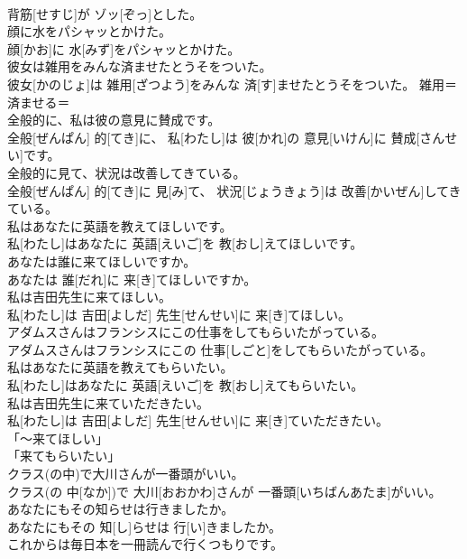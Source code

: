 \documentclass[8pt]{extreport}
\begin{document}
\begin{CJK}{UTF8}{min}
\\	背筋[せすじ]が ゾッ[ぞっ]とした。	
\\	顔に水をパシャッとかけた。	
\\	顔[かお]に 水[みず]をパシャッとかけた。	
\\	彼女は雑用をみんな済ませたとうそをついた。	
\\	彼女[かのじょ]は 雑用[ざつよう]をみんな 済[す]ませたとうそをついた。	雑用＝ 
\\	済ませる＝ 
\\	全般的に、私は彼の意見に賛成です。	
\\	全般[ぜんぱん] 的[てき]に、 私[わたし]は 彼[かれ]の 意見[いけん]に 賛成[さんせい]です。	
\\	全般的に見て、状況は改善してきている。	
\\	全般[ぜんぱん] 的[てき]に 見[み]て、 状況[じょうきょう]は 改善[かいぜん]してきている。	
\\	私はあなたに英語を教えてほしいです。	
\\	私[わたし]はあなたに 英語[えいご]を 教[おし]えてほしいです。	
\\	あなたは誰に来てほしいですか。	
\\	あなたは 誰[だれ]に 来[き]てほしいですか。	
\\	私は吉田先生に来てほしい。	
\\	私[わたし]は 吉田[よしだ] 先生[せんせい]に 来[き]てほしい。	
\\	アダムスさんはフランシスにこの仕事をしてもらいたがっている。	
\\	アダムスさんはフランシスにこの 仕事[しごと]をしてもらいたがっている。	
\\	私はあなたに英語を教えてもらいたい。	
\\	私[わたし]はあなたに 英語[えいご]を 教[おし]えてもらいたい。	
\\	私は吉田先生に来ていただきたい。	
\\	私[わたし]は 吉田[よしだ] 先生[せんせい]に 来[き]ていただきたい。	
\\	「〜来てほしい」
\\	「来てもらいたい」
\\	クラス(の中)で大川さんが一番頭がいい。	
\\	クラス(の 中[なか])で 大川[おおかわ]さんが 一番頭[いちばんあたま]がいい。	
\\	あなたにもその知らせは行きましたか。	
\\	あなたにもその 知[し]らせは 行[い]きましたか。	
\\	これからは毎日本を一冊読んで行くつもりです。	

\end{CJK}
\end{document}
